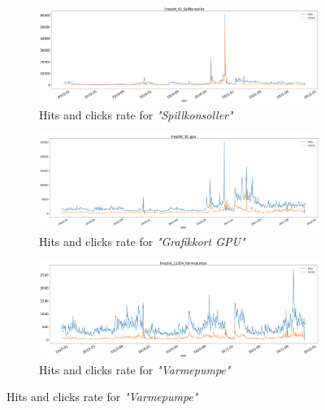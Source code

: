 \begin{figure}[h!]
  \centering
  \caption{Category plots of hits and click rate from 2019-2021}
  \label{fig:lineplot2}

  \begin{subfigure}[b]{\textwidth}
    \includegraphics[width=\textwidth]{./figs/code_generated/data_exploration/lineplot_43_Spillkonsoller.png}
    \hfill
    \caption{Hits and clicks rate for \textit{"Spillkonsoller"}}
    \label{fig:lineplot-Spillkonsoller}
  \end{subfigure}
  \begin{subfigure}[b]{\textwidth}
    \includegraphics[width=\textwidth]{./figs/code_generated/data_exploration/lineplot_30_gpu.png}
    \hfill
    \caption{Hits and clicks rate for \textit{"Grafikkort GPU"}}
    \label{fig:lineplot-GPU}
  \end{subfigure}

  \begin{subfigure}[b]{\textwidth}
    \includegraphics[width=\textwidth]{./figs/code_generated/data_exploration/lineplot_11054_Varmepumpe.png}
    \hfill
    \caption{Hits and clicks rate for \textit{"Varmepumpe"}}
    \label{fig:lineplot-Varmepumpe}
  \end{subfigure}
\end{figure}

